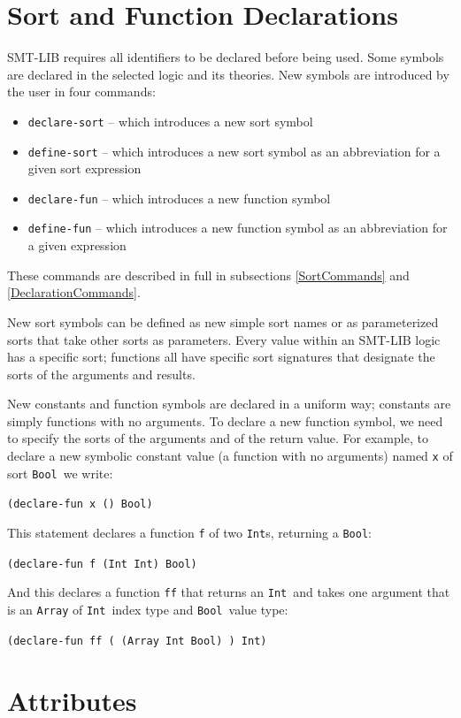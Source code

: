 \documentclass[12pt,oneside]{report}
\newcommand{\Bool}{{\tt Bool}}
\newcommand{\Int}{{\tt Int}}
\newcommand{\nospace}{\setlength{\itemsep}{0in}\setlength{\parsep}{0in}\setlength{\parskip}{0in}\setlength{\topsep}{0in}}
\begin{document}
\section{Sort and Function Declarations}

SMT-LIB requires all identifiers to be declared before being used. Some symbols are declared in the selected logic and its theories.
New symbols are introduced by the user in four commands:
\begin{itemize} \nospace
\item[] {\tt declare-sort} -- which introduces a new sort symbol
\item[] {\tt define-sort} -- which introduces a new sort symbol as an abbreviation for a given sort expression
\item[] {\tt declare-fun} -- which introduces a new function symbol
\item[] {\tt define-fun} -- which introduces a new function symbol as an abbreviation for a given expression
\end{itemize}
These commands are described in full in subsections \ref{SortCommands} and \ref{DeclarationCommands}.

New sort symbols can be defined as new simple sort names or as parameterized sorts that take other sorts as parameters.
Every value within an SMT-LIB logic has a specific sort; functions all have specific sort signatures that designate
the sorts of the arguments and results.
 
New 
constants and function symbols are declared in a uniform way; constants are
simply functions with no arguments.  To declare a new function symbol,
we need to specify the sorts of the arguments and of the return value.
For example,
 to declare a new symbolic constant value (a function with no arguments) named {\tt x} of sort \Bool~we write:\\
\centerline{\tt (declare-fun x () Bool)}
This statement declares a function {\tt f} of two \Int s, returning a \Bool:\\
\centerline{\tt (declare-fun f (Int Int) Bool)}
And this declares a function {\tt ff} that returns an \Int~and takes one argument
that is an {\tt Array} of \Int~index type and \Bool~value type:\\
\centerline{\tt (declare-fun ff ( (Array Int Bool) ) Int)}

\section{Attributes}
\label{Attributes}
\end{document}
